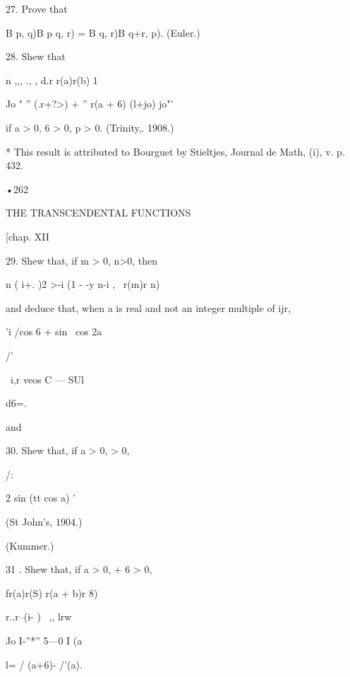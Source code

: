 27. Prove that 

B p, q)B p q, r) = B q, r)B q+r, p). (Euler.) 

28. Shew that 

n ,,, ., , d.r r(a)r(b) 1 

Jo " '' (.r+?>)  + '' r(a + 6) (l+jo) jo"' 

if a > 0, 6 > 0, p > 0. (Trinity,. 1908.) 

* This result is attributed to Bourguet by Stieltjes, Journal de Math, (i), v. p. 432. 



•262 



THE TRANSCENDENTAL FUNCTIONS 



[chap. XII 



29. Shew that, if m > 0, n>0, then 

n ( i+. )2 >-i (1 - -y n-i ,  \   r(m)r n) 

and deduce that, when a is real and not an integer multiple of ijr, 

'i  /cos 6 + sin  \ cos 2a 



/' 



\ i,r veos C  — SUl 



d6=. 



and 



30. Shew that, if a > 0,   > 0, 



/: 



2 sin (tt cos  a) ' 






(St John's, 1904.) 



(Kummer.) 



31 . Shew that, if a > 0,   + 6 > 0, 

fr(a)r(S) r(a + b)r 8) 



r..r--(i- ) \ ,, lrw 

Jo I-''*'' 5—0 I  (a  



l=  / (a+6)- /'(a). 




